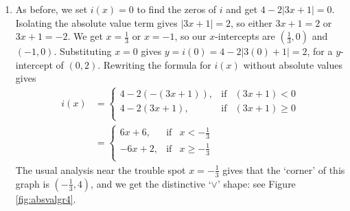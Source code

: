 {\begin{enumerate}
\[ h(x) =\left\{ \begin{array}{rcl} -x-3, & \mbox{if} & x<0  \\ x-3, & \mbox{if} & x \geq 0 \\ \end{array} \right.\]


Once again, the open circle at $(0,-3)$ from one piece of the graph of $h$ is filled by the point $(0,-3)$ from the other piece of $h$.  From the graph, we determine the domain of $h$ is $(-\infty, \infty)$ and the range is $[-3,\infty)$.   On $[0,\infty)$, $h$ is increasing;  on $(-\infty,0]$ it is decreasing.  The relative minimum occurs at the point $(0,-3)$ on the graph, and we see $-3$ is both the relative and absolute minimum value of $h$.  Also, $h$ has no relative or absolute maximum value.



\item As before, we set $i(x)=0$ to find the zeros of $i$ and get $4 - 2|3x+1|=0$.  Isolating the absolute value term gives $|3x+1|=2$, so either  $3x+1 = 2$ or $3x+1=-2$.  We get $x=\frac{1}{3}$ or $x=-1$, so our $x$-intercepts are $\left(\frac{1}{3},0\right)$ and $(-1,0)$.  Substituting $x=0$ gives $y = i(0) = 4-2|3(0)+1| = 2$, for a $y$-intercept of $(0,2)$.  Rewriting the formula for $i(x)$ without absolute values gives  
\begin{align*}
i(x) & = \left\{ \begin{array}{rcl} 4-2(-(3x+1)), & \mbox{if} & (3x+1) <0  \\ 4-2(3x+1), & \mbox{if} & (3x+1) \geq 0 \\ \end{array} \right.\\
& = \left\{ \begin{array}{rcl} 6x+6, & \mbox{if} & x < -\frac{1}{3} \\[2pt]  -6x+2, & \mbox{if} & x \geq - \frac{1}{3} \\ \end{array} \right.
\end{align*}
The usual analysis near the trouble spot $x=-\frac{1}{3}$ gives that the `corner' of this graph is  $\left( -\frac{1}{3}, 4\right)$, and we get the distinctive `$\vee$' shape: see Figure \ref{fig:absvalgr4}.


\end{enumerate}}
